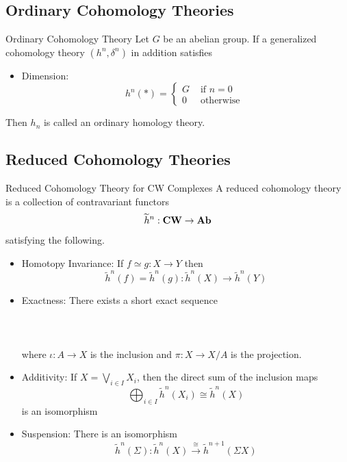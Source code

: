 \documentclass[a4paper]{article}
\begin{document}
\subsection{Ordinary Cohomology Theories}
\begin{defn}{Ordinary Cohomology Theory}{} Let $G$ be an abelian group. If a generalized cohomology theory $(h^n,\delta^n)$ in addition satisfies 
\begin{itemize}
\item Dimension: $$h^n(\ast)=\begin{cases}
G & \text{ if } n=0\\
0 & \text{ otherwise }
\end{cases}$$
\end{itemize}
Then $h_n$ is called an ordinary homology theory. 
\end{defn}

\subsection{Reduced Cohomology Theories}
\begin{defn}{Reduced Cohomology Theory for CW Complexes}{} A reduced cohomology theory is a collection of contravariant functors $$\widetilde{h}^n:\bold{CW}\to\bold{Ab}$$ satisfying the following. 
\begin{itemize}
\item Homotopy Invariance: If $f\simeq g:X\to Y$ then $$\widetilde{h}^n(f)=\widetilde{h}^n(g):\widetilde{h}^n(X)\to\widetilde{h}^n(Y)$$
\item Exactness: There exists a short exact sequence \\~\\
\\~\\
where $\iota:A\to X$ is the inclusion and $\pi:X\to X/A$ is the projection. 
\item Additivity: If $X=\bigvee_{i\in I}X_i$, then the direct sum of the inclusion maps $$\bigoplus_{i\in I}\widetilde{h}^n(X_i)\cong\widetilde{h}^n(X)$$ is an isomorphism
\item Suspension: There is an isomorphism $$\widetilde{h}^n(\Sigma):\widetilde{h}^n(X)\overset{\cong}{\longrightarrow}\widetilde{h}^{n+1}(\Sigma X)$$
\end{itemize}
\end{defn}
\end{document}
